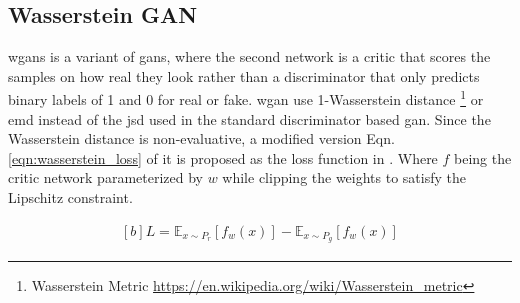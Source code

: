\subsection{Wasserstein GAN}
\acp{wgan} is a variant of \acp{gan}, where the second network is a critic that scores the samples on how real they look rather than a discriminator that only predicts binary labels of 1 and 0 for real or fake. \ac{wgan} use 1-Wasserstein distance \footnote{Wasserstein Metric \url{https://en.wikipedia.org/wiki/Wasserstein_metric}} or \ac{emd} instead of the \ac{jsd} used in the standard discriminator based \ac{gan}. Since the Wasserstein distance is non-evaluative, a modified version Eqn. \ref{eqn:wasserstein_loss} of it is proposed as the loss function in \cite{soumith2017wasserstein}. Where $f$ being the critic network parameterized by $w$ while clipping the weights to satisfy the Lipschitz constraint.

\begin{equation} \label{eqn:wasserstein_loss}
    \begin{aligned}[b]
        L=\mathbb{E}_{x \sim P_{r}}\left[f_{w}(x)\right]-\mathbb{E}_{x \sim P_{g}}\left[f_{w}(x)\right]
    \end{aligned}
\end{equation}





